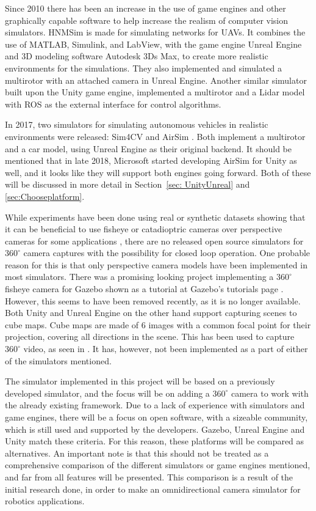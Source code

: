 Since 2010 there has been an increase in the use of game engines and other graphically capable software to help increase the realism of computer vision simulators. HNMSim \cite{HNMSimPaper} is made for simulating networks for UAVs. It combines the use of MATLAB, Simulink, and LabView, with the game engine Unreal Engine and 3D modeling software Autodesk 3Ds Max, to create more realistic environments for the simulations. They also implemented and simulated a multirotor with an attached camera in Unreal Engine. Another similar simulator\cite{UnityROSsim} built upon the Unity game engine, implemented a multirotor and a Lidar model with ROS as the external interface for control algorithms.

In 2017, two simulators for simulating autonomous vehicles in realistic environments were released: Sim4CV \cite{Sim4CV_paper} and AirSim \cite{Airsim_paper}. Both implement a multirotor and a car model, using Unreal Engine as their original backend. It should be mentioned that in late 2018, Microsoft started developing AirSim for Unity as well, and it looks like they will support both engines going forward. Both of these will be discussed in more detail in Section~\ref{sec: UnityUnreal} and \ref{sec:Chooseplatform}.

While experiments have been done using real or synthetic datasets showing that it can be beneficial to use fisheye or catadioptric cameras over perspective cameras for some applications \cite{Zhang2016BenefitOL, OmniVIOKalman, CompOmniVSLAM}, there are no released open source simulators for $360^\circ$ camera captures with the possibility for closed loop operation. One probable reason for this is that only perspective camera models have been implemented in most simulators. There was a promising looking project implementing a $360^\circ$ fisheye camera for Gazebo shown as a tutorial at Gazebo's tutorials page \cite{GazeboWideWeb}. However, this seems to have been removed recently, as it is no longer available. Both Unity and Unreal Engine on the other hand support capturing scenes to cube maps. Cube maps are made of 6 images with a common focal point for their projection, covering all directions in the scene. This has been used to capture $360^\circ$ video, as seen in \cite{UnityCubeCapture, UnrealCubeCapture}. It has, however, not been implemented as a part of either of the simulators mentioned. 

The simulator implemented in this project will be based on a previously developed simulator, and the focus will be on adding a $360^\circ$ camera to work with the already existing framework. Due to a lack of experience with simulators and game engines, there will be a focus on open software, with a sizeable community, which is still used and supported by the developers. Gazebo, Unreal Engine and Unity match these criteria. For this reason, these platforms will be compared as alternatives. An important note is that this should not be treated as a comprehensive comparison of the different simulators or game engines mentioned, and far from all features will be presented. This comparison is a result of the initial research done, in order to make an omnidirectional camera simulator for robotics applications.

